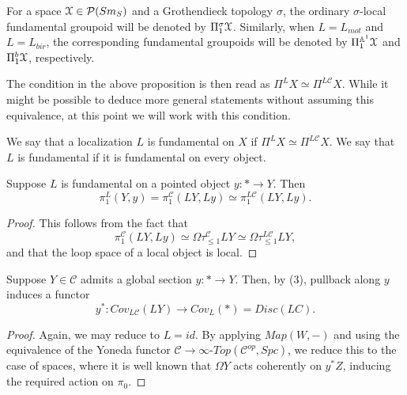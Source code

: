 \begin{ex}
For a space $\EuScript{X}\in\mathcal{P}(Sm_S)$ and a Grothendieck topology $\sigma$,  
 the ordinary $\sigma$-local fundamental groupoid will be denoted by $\Pi_1^\sigma\EuScript{X}$. Similarly, when $L=L_{mot} $ and $L=L_{bir} $, the corresponding fundamental groupoids will be denoted by $\Pi_1^{\mathbb{A}^1}\EuScript{X}$ and $\Pi_1^{b}\EuScript{X}$, respectively. 
\end{ex}
The condition in the above proposition is then read as $\Pi^LX\simeq \Pi^{L\mathcal{C}}X$. While it might be possible to deduce more general statements without assuming this equivalence, at this point we will work with this condition.  
\begin{defn}
    We say that a localization $L$ is fundamental on $X$ if $\Pi^LX\simeq \Pi^{L\mathcal{C}}X$. We say that $L$ is fundamental if it is fundamental on every object.
\end{defn} 
\begin{lem}
    Suppose $L$ is fundamental on a pointed object $y:*\to Y$. Then 
    $$\pi_1^L(Y,y)=\pi_1^\mathcal{C}(LY,Ly)\simeq \pi_1^{L\mathcal{C}}(LY,Ly).$$
    \end{lem}
    \begin{proof}
        This follows from the fact that $$\pi_1^\mathcal{C}(LY,Ly)\simeq \Omega \tau_{\leq 1}^{\mathcal{C}}LY\simeq \Omega \tau_{\leq 1}^{L\mathcal{C}}LY,$$
        and that the loop space of a local object is local.
    \end{proof}
 Suppose $Y\in \mathcal{C}$ admits a global section $y: *\to Y$. Then, by  (3), pullback along $y$ induces a functor $$y^*:Cov_{L\mathcal{C}}(LY)\to Cov_L(*)=Disc(LC).$$

\begin{proof}
Again, we may reduce to $L=id$. By applying $Map(W,-)$ and using the equivalence of the Yoneda functor $\mathcal{C}\to \infty \mbox{-}Top(\mathcal{C}^{op},Spc)$, we reduce this to the case of spaces, where it is well known that $\Omega Y$ acts coherently on $y^*Z$, inducing the required action on $\pi_0$.
\end{proof}


